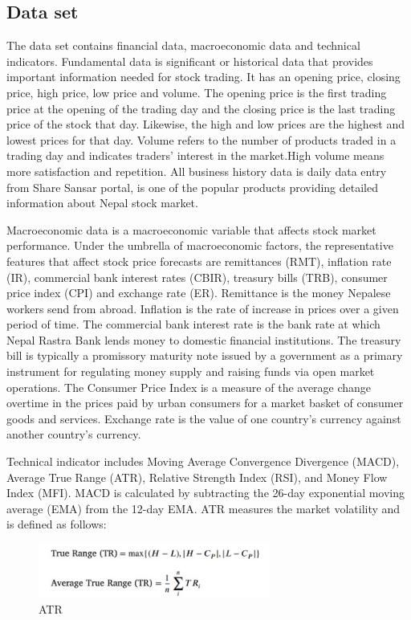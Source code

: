 \subsection{Data set}
\vspace{-18pt}
The data set contains financial data, macroeconomic data and technical indicators. Fundamental data is significant or historical data that provides important information needed for stock trading. It has an opening price, closing price, high price, low price and volume. The opening price is the first trading price at the opening of the trading day and the closing price is the last trading price of the stock that day. Likewise, the high and low prices are the highest and lowest prices for that day. Volume refers to the number of products traded in a trading day and indicates traders' interest in the market.High volume means more satisfaction and repetition. All business history data is daily data entry from Share Sansar portal, is one of the popular products providing detailed information about Nepal stock market.
\par
Macroeconomic data is a macroeconomic variable that affects stock market performance. Under the umbrella of macroeconomic factors, the representative features that affect stock price forecasts are remittances (RMT), inflation rate (IR), commercial bank interest rates (CBIR), treasury bills (TRB), consumer price index (CPI) and exchange rate (ER). Remittance is the money Nepalese workers send from abroad. Inflation is the rate of increase in prices over a given period of time.  The commercial bank interest rate is the bank rate at which Nepal Rastra Bank lends money to domestic financial institutions. The treasury bill is typically a promissory maturity note issued by a government as a primary instrument for regulating money supply and raising funds via open market operations. The Consumer Price Index is a measure of the average change overtime in the prices paid by urban consumers for a market basket of consumer goods and services. Exchange rate is the value of one country's currency against another country's currency.
 \par 
Technical indicator includes Moving Average Convergence Divergence (MACD), Average True Range (ATR), Relative Strength Index (RSI), and Money Flow Index (MFI). MACD is calculated by subtracting the 26-day exponential moving average (EMA) from the 12-day EMA. ATR measures the market volatility and is defined as follows:\newpage
\begin{figure}[tbh] %
\begin{center}
	\includegraphics[width=3in]{images/fmla1.jpg} 
	\caption{ATR} %
	\label{ATR} %
\end{center}
\end{figure}
